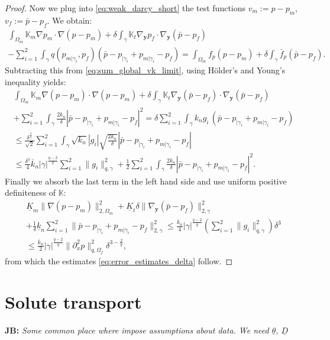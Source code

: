 \documentclass[a4paper]{article}
\def\vc#1{\mathbf{\boldsymbol{#1}}}     %
\def\tn#1{{\mathbb{#1}}}    %
\def\norm#1{\|#1\|}
\def\yy{{\vc y}}
\def\ul{\underline}
\newcommand{\note}[2]{{\color{blue} \textbf{ #1:} \textit{#2}}}
\begin{document}
\begin{proof}
Now we plug into \eqref{eq:weak_darcy_short} the test functions $v_m:=p-p_m$, $v_f:=\bar p-p_f$.
We obtain:
\begin{multline*}
\int_{\Omega_m}\tn K_m\nabla p_m\cdot\nabla(p-p_m) + \delta\int_\gamma\tn K_t\nabla_\yy p_f\cdot\nabla_\yy(\bar p-p_f)\\
- \sum_{i=1}^2\int_\gamma q(p_{m|\gamma_i},p_f)(\bar p - p_{|\gamma_i}+p_{m|\gamma_i} - p_f)
= \int_{\Omega_m} f_p(p-p_m)
+ \delta\int_\gamma\bar f_p(\bar p-p_f).
\end{multline*}
Subtracting this from \eqref{eq:sum_global_vk_limit}, using H\"older's and Young's inequality yields:
\begin{multline}
\int_{\Omega_m}\tn K_m\nabla (p-p_m)\cdot\nabla(p-p_m)
+\delta\int_\gamma\tn K_t\nabla_\yy(\bar p-p_f)\cdot\nabla_\yy(\bar p-p_f)\\
+ \sum_{i=1}^2\int_\gamma \frac{2k_n}\delta |\bar p - p_{|\gamma_i} + p_{m|\gamma_i} - p_f|^2
= \delta\sum_{i=1}^2\int_\gamma k_n g_i\, (\bar p - p_{|\gamma_i} + p_{m|\gamma_i} - p_f)\\
\le \frac{\delta^{\frac32}}{\sqrt2}\sum_{i=1}^2\int_\gamma \sqrt{k_n}|g_i|\sqrt{\frac{2k_n}\delta}|\bar p - p_{|\gamma_i} + p_{m|\gamma_i} - p_f|\\
\le \frac{\delta^3}4\overline k_n|\gamma|^{\frac{q-2}q}\sum_{i=1}^2\norm{g_i}_{q,\gamma}^2 + \frac12\sum_{i=1}^2\int_\gamma \frac{2k_n}\delta |\bar p - p_{|\gamma_i} + p_{m|\gamma_i} - p_f|^2.
\end{multline}
Finally we absorb the last term in the left hand side and use uniform positive definiteness of $\tn K$:
\begin{multline}
\underline K_m\norm{\nabla (p-p_m)}_{2,\Omega_m}^2
+\underline K_t\delta\norm{\nabla_\yy(\bar p-p_f)}_{2,\gamma}^2\\
+ \frac1\delta\underline k_n\sum_{i=1}^2\norm{\bar p - p_{|\gamma_i} + p_{m|\gamma_i} - p_f}_{2,\gamma}^2
\le \frac{\overline k_n}4|\gamma|^{\frac{q-2}q}\left(\sum_{i=1}^2\norm{g_i}_{q,\gamma}^2\right)\delta^3\\
\le \frac{\overline k_n}2|\gamma|^{\frac{q-2}q}\norm{\partial_x^2 p}_{q,\Omega_f}^2\delta^{3-\frac2q},
\end{multline}
from which the estimates \eqref{eq:error_estimates_delta} follow.
\end{proof}

\section{Solute transport}
\note{JB}{Some common place where impose assumptions about data. We need $\ul{\theta}$, $\ul{D}$}
\end{document}
